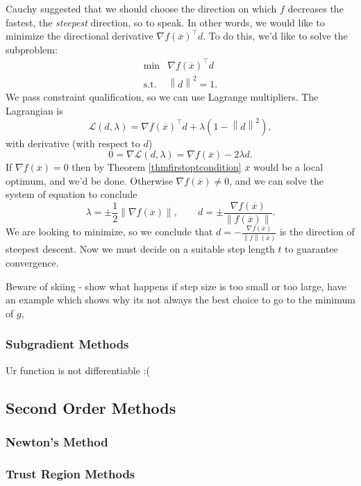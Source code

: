 \documentclass[11pt]{article}
\numberwithin{equation}{section}
\theoremstyle{definition}
\newcommand{\cL}{\mathcal{L}}
\newcommand{\norm}[1]{\left\lVert#1\right\rVert}
\newcommand{\ox}{\overline{x}}
\begin{document}
Cauchy suggested that we should choose the direction on which $f$ decreases the fastest, the \textit{steepest} direction, so to speak. In other words, we would like to minimize the directional derivative $\nabla f(\ox)^\top d$. To do this, we'd like to solve the subproblem:
\begin{equation}
    \begin{array}{cc}
         \min & \nabla f(\ox)^\top d \\
         \mathrm{s.t.} & \norm d^2=1.
    \end{array}
\end{equation}
We pass constraint qualification, so we can use Lagrange multipliers. The Lagrangian is
\begin{equation}
    \cL(d,\lambda)=\nabla f(\ox)^\top d+\lambda(1-\norm d^2),
\end{equation}
with derivative (with respect to $d$)
\begin{equation}
    0=\nabla\cL(d,\lambda)=\nabla f(\ox) - 2\lambda d.
\end{equation}
If $\nabla f(\ox)=0$ then by Theorem \ref{thmfirstoptcondition} $\ox$ would be a local optimum, and we'd be done. Otherwise $\nabla f(\ox)\neq 0$, and we can solve the system of equation to conclude
\begin{equation}
    \lambda=\pm\frac12\norm{\nabla f(\ox)},\qquad d=\pm\frac{\nabla f(\ox)}{\norm {f(\ox)}}.
\end{equation}
We are looking to minimize, so we conclude that $d=-\frac{\nabla f(\ox)}{\norm f(\ox)}$ is the direction of steepest descent. Now we must decide on a suitable step length $t$ to guarantee convergence.

Beware of skiing - show what happens if step size is too small or too large, have an example which shows why its not always the best choice to go to the minimum of $g$, 
\subsubsection{Subgradient Methods}
Ur function is not differentiable :(
\subsection{Second Order Methods}
\subsubsection{Newton's Method}
\subsubsection{Trust Region Methods}
\end{document}
